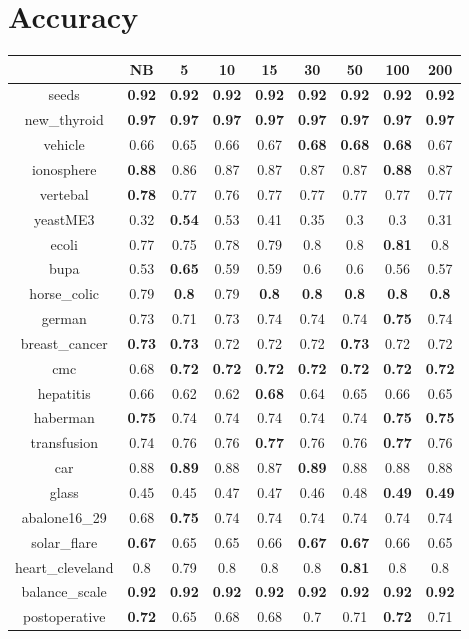 \documentclass{article}%
\begin{document}
%
\normalsize%
\section*{Accuracy}%
\begin{tabular}{c|cccccccc}%
\hline%
&NB&5&10&15&30&50&100&200\\%
\hline%
seeds&\textbf{0.92}&\textbf{0.92}&\textbf{0.92}&\textbf{0.92}&\textbf{0.92}&\textbf{0.92}&\textbf{0.92}&\textbf{0.92}\\%
new\_thyroid&\textbf{0.97}&\textbf{0.97}&\textbf{0.97}&\textbf{0.97}&\textbf{0.97}&\textbf{0.97}&\textbf{0.97}&\textbf{0.97}\\%
vehicle&0.66&0.65&0.66&0.67&\textbf{0.68}&\textbf{0.68}&\textbf{0.68}&0.67\\%
ionosphere&\textbf{0.88}&0.86&0.87&0.87&0.87&0.87&\textbf{0.88}&0.87\\%
vertebal&\textbf{0.78}&0.77&0.76&0.77&0.77&0.77&0.77&0.77\\%
yeastME3&0.32&\textbf{0.54}&0.53&0.41&0.35&0.3&0.3&0.31\\%
ecoli&0.77&0.75&0.78&0.79&0.8&0.8&\textbf{0.81}&0.8\\%
bupa&0.53&\textbf{0.65}&0.59&0.59&0.6&0.6&0.56&0.57\\%
horse\_colic&0.79&\textbf{0.8}&0.79&\textbf{0.8}&\textbf{0.8}&\textbf{0.8}&\textbf{0.8}&\textbf{0.8}\\%
german&0.73&0.71&0.73&0.74&0.74&0.74&\textbf{0.75}&0.74\\%
breast\_cancer&\textbf{0.73}&\textbf{0.73}&0.72&0.72&0.72&\textbf{0.73}&0.72&0.72\\%
cmc&0.68&\textbf{0.72}&\textbf{0.72}&\textbf{0.72}&\textbf{0.72}&\textbf{0.72}&\textbf{0.72}&\textbf{0.72}\\%
hepatitis&0.66&0.62&0.62&\textbf{0.68}&0.64&0.65&0.66&0.65\\%
haberman&\textbf{0.75}&0.74&0.74&0.74&0.74&0.74&\textbf{0.75}&\textbf{0.75}\\%
transfusion&0.74&0.76&0.76&\textbf{0.77}&0.76&0.76&\textbf{0.77}&0.76\\%
car&0.88&\textbf{0.89}&0.88&0.87&\textbf{0.89}&0.88&0.88&0.88\\%
glass&0.45&0.45&0.47&0.47&0.46&0.48&\textbf{0.49}&\textbf{0.49}\\%
abalone16\_29&0.68&\textbf{0.75}&0.74&0.74&0.74&0.74&0.74&0.74\\%
solar\_flare&\textbf{0.67}&0.65&0.65&0.66&\textbf{0.67}&\textbf{0.67}&0.66&0.65\\%
heart\_cleveland&0.8&0.79&0.8&0.8&0.8&\textbf{0.81}&0.8&0.8\\%
balance\_scale&\textbf{0.92}&\textbf{0.92}&\textbf{0.92}&\textbf{0.92}&\textbf{0.92}&\textbf{0.92}&\textbf{0.92}&\textbf{0.92}\\%
postoperative&\textbf{0.72}&0.65&0.68&0.68&0.7&0.71&\textbf{0.72}&0.71\\%
\end{tabular}
\end{document}
